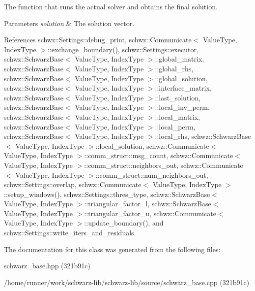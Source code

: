 The function that runs the actual solver and obtains the final solution. 


\begin{DoxyParams}{Parameters}
{\em solution} & The solution vector. \\
\hline
\end{DoxyParams}


References schwz\+::\+Settings\+::debug\+\_\+print, schwz\+::\+Communicate$<$ Value\+Type, Index\+Type $>$\+::exchange\+\_\+boundary(), schwz\+::\+Settings\+::executor, schwz\+::\+Schwarz\+Base$<$ Value\+Type, Index\+Type $>$\+::global\+\_\+matrix, schwz\+::\+Schwarz\+Base$<$ Value\+Type, Index\+Type $>$\+::global\+\_\+rhs, schwz\+::\+Schwarz\+Base$<$ Value\+Type, Index\+Type $>$\+::global\+\_\+solution, schwz\+::\+Schwarz\+Base$<$ Value\+Type, Index\+Type $>$\+::interface\+\_\+matrix, schwz\+::\+Schwarz\+Base$<$ Value\+Type, Index\+Type $>$\+::last\+\_\+solution, schwz\+::\+Schwarz\+Base$<$ Value\+Type, Index\+Type $>$\+::local\+\_\+inv\+\_\+perm, schwz\+::\+Schwarz\+Base$<$ Value\+Type, Index\+Type $>$\+::local\+\_\+matrix, schwz\+::\+Schwarz\+Base$<$ Value\+Type, Index\+Type $>$\+::local\+\_\+perm, schwz\+::\+Schwarz\+Base$<$ Value\+Type, Index\+Type $>$\+::local\+\_\+rhs, schwz\+::\+Schwarz\+Base$<$ Value\+Type, Index\+Type $>$\+::local\+\_\+solution, schwz\+::\+Communicate$<$ Value\+Type, Index\+Type $>$\+::comm\+\_\+struct\+::msg\+\_\+count, schwz\+::\+Communicate$<$ Value\+Type, Index\+Type $>$\+::comm\+\_\+struct\+::neighbors\+\_\+out, schwz\+::\+Communicate$<$ Value\+Type, Index\+Type $>$\+::comm\+\_\+struct\+::num\+\_\+neighbors\+\_\+out, schwz\+::\+Settings\+::overlap, schwz\+::\+Communicate$<$ Value\+Type, Index\+Type $>$\+::setup\+\_\+windows(), schwz\+::\+Settings\+::thres\+\_\+type, schwz\+::\+Schwarz\+Base$<$ Value\+Type, Index\+Type $>$\+::triangular\+\_\+factor\+\_\+l, schwz\+::\+Schwarz\+Base$<$ Value\+Type, Index\+Type $>$\+::triangular\+\_\+factor\+\_\+u, schwz\+::\+Communicate$<$ Value\+Type, Index\+Type $>$\+::update\+\_\+boundary(), and schwz\+::\+Settings\+::write\+\_\+iters\+\_\+and\+\_\+residuals.



The documentation for this class was generated from the following files\+:\begin{DoxyCompactItemize}
\item 
schwarz\+\_\+base.\+hpp (321b91c)\item 
/home/runner/work/schwarz-\/lib/schwarz-\/lib/source/schwarz\+\_\+base.\+cpp (321b91c)\end{DoxyCompactItemize}
